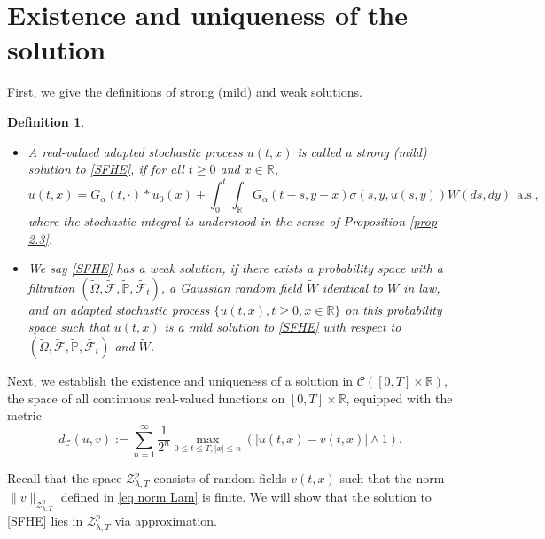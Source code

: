 \documentclass[11pt,reqno]{amsart}
\numberwithin{equation}{section}
\newtheorem{definition}[theorem]{Definition}
\newcommand{\1}{{\bf 1}}
\newcommand{\2}{{\bf 2}}
\begin{document}
\section{Existence and uniqueness  of the solution}\label{sec solution}


First,  we give the definitions of strong (mild) and weak solutions.
\begin{definition}\label{def mild}
  \begin{itemize}
\item[(i)] A    real-valued adapted stochastic process $u(t,x)$ is called a  strong  (mild) solution  to \eqref{SFHE}, if for all $t\ge0$ and $x\in\mathbb{R}$,
\begin{equation}\label{eq solution}
u(t,x)=G_{\alpha}(t,\cdot)*u_0(x)+\int_0^t\int_{\mathbb{R}}G_{\alpha}(t-s,y-x)\sigma(s,y,u(s,y))W(ds,dy)\ \ \text{a.s.},
\end{equation}
  where the stochastic integral is understood in the sense of Proposition \ref{prop 2.3}.
\item[(ii)] We say \eqref{SFHE} has a {\it weak solution}, if there exists a probability space with a filtration $(\widetilde{\Omega},\widetilde{\mathcal{F}},\widetilde{\mathbb{P}},\widetilde{\mathcal{F}_t})$, a Gaussian random field $\widetilde{W}$ identical to $W$ in law, and an adapted stochastic process  $\{u(t,x),t\ge0,x\in\mathbb{R}\}$ on this probability space   such that $u(t,x)$ is a mild solution to \eqref{SFHE} with respect to $(\widetilde{\Omega},\widetilde{\mathcal{F}},\widetilde{\mathbb{P}},\widetilde{\mathcal{F}_t})$ and $\widetilde{W}$.
\end{itemize}
 \end{definition}




Next, we establish the  existence and uniqueness of a solution   in $\mathcal{C}([0,T]\times\mathbb{R})$, the space of all continuous real-valued functions on $[0,T]\times\mathbb{R}$, equipped with the metric
\begin{equation}\label{distance}
d_{\mathcal{C}}(u,v):=\sum_{n=1}^{\infty}\frac{1}{2^n}\max_{0\le t\le T,|x|\le n} \left(|u(t,x)-v(t,x)|\wedge 1\right).
\end{equation}

Recall that the space $\mathcal{Z}_{\lambda,T}^p$ consists of random fields $v(t,x)$ such that  the norm $\|v\|_{\mathcal{Z}_{\lambda,T}^p}$ defined in \eqref{eq norm Lam} is finite. 
We will show that the solution to \eqref{SFHE} lies in $\mathcal{Z}_{\lambda,T}^p$ via approximation.
\end{document}
